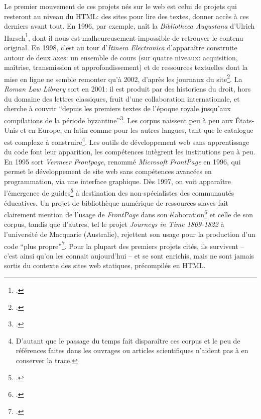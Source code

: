 Le premier mouvement de ces projets nés sur le web est celui de projets qui resteront au niveau du HTML: des sites pour lire des textes, donner accès à ces derniers avant tout. En 1996, par exemple, naît la \textit{Bibliotheca Augustana} d'Ulrich Harsch\footcite{harsch_bibliotheca_nodate}, dont il nous est malheureusement impossible de retrouver le contenu original. En 1998, c'est au tour d'\textit{Itinera Electronica} d'apparaître construite autour de deux axes: un ensemble de cours (sur quatre niveaux: acquisition, maîtrise, transmission et approfondissement) et de ressources textuelles dont la mise en ligne ne semble remonter qu'à 2002, d'après les journaux du site\footcite{meurant_itinera_nodate}. La \textit{Roman Law Library} sort en 2001: il est produit par des historiens du droit, hors du domaine des lettres classiques, fruit d'une collaboration internationale, et cherche à couvrir ``depuis les premiers textes de l'époque royale jusqu'aux compilations de la période byzantine''\footcite{lassard_roman_2001}. Les corpus naissent peu à peu aux États-Unis et en Europe, en latin comme pour les autres langues, tant que le catalogue est complexe à construire\footnote{D'autant que le passage du temps fait disparaître ces corpus et le peu de références faites dans les ouvrages ou articles scientifiques n'aident pas à en conserver la trace.}. Les outils de développement web sans apprentissage du code font leur apparition, les compétences intègrent les institutions peu à peu. En 1995 sort \textit{Vermeer Frontpage}, renommé \textit{Microsoft FrontPage} en 1996, qui permet le développement de site web sans compétences avancées en programmation, via une interface graphique. Dès 1997, on voit apparaître l'émergence de guides\footcite{la1997guide} à destination des non-spécialistes des communautés éducatives. Un projet de bibliothèque numérique de ressources slaves fait clairement mention de l'usage de \textit{FrontPage} dans son élaboration\footcite{deyrup1998character} et celle de son corpus, tandis que d'autres, tel le projet \textit{Journeys in Time 1809-1822} à l'université de Macquarie (Australie), rejettent son usage pour la production d'un code ``plus propre''\footcite[p.~41]{10.3316/informit.752609435027594}. Pour la plupart des premiers projets cités, ils survivent -- c'est ainsi qu'on les connait aujourd'hui -- et se sont enrichis, mais ne sont jamais sortis du contexte des sites web statiques, précompilés en HTML.

